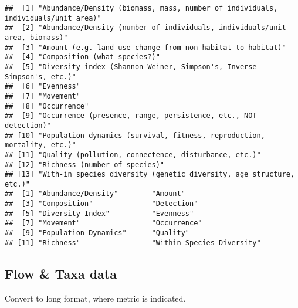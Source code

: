 \documentclass[
]{article}
\begin{document}
\begin{verbatim}
##  [1] "Abundance/Density (biomass, mass, number of individuals, individuals/unit area)"
##  [2] "Abundance/Density (number of individuals, individuals/unit area, biomass)"      
##  [3] "Amount (e.g. land use change from non-habitat to habitat)"                      
##  [4] "Composition (what species?)"                                                    
##  [5] "Diversity index (Shannon-Weiner, Simpson's, Inverse Simpson's, etc.)"           
##  [6] "Evenness"                                                                       
##  [7] "Movement"                                                                       
##  [8] "Occurrence"                                                                     
##  [9] "Occurrence (presence, range, persistence, etc., NOT detection)"                 
## [10] "Population dynamics (survival, fitness, reproduction, mortality, etc.)"         
## [11] "Quality (pollution, connectence, disturbance, etc.)"                            
## [12] "Richness (number of species)"                                                   
## [13] "With-in species diversity (genetic diversity, age structure, etc.)"             
##  [1] "Abundance/Density"        "Amount"                  
##  [3] "Composition"              "Detection"               
##  [5] "Diversity Index"          "Evenness"                
##  [7] "Movement"                 "Occurrence"              
##  [9] "Population Dynamics"      "Quality"                 
## [11] "Richness"                 "Within Species Diversity"
\end{verbatim}

\hypertarget{flow-taxa-data}{%
\subsection{Flow \& Taxa data}\label{flow-taxa-data}}

Convert to long format, where metric is indicated.
\end{document}
